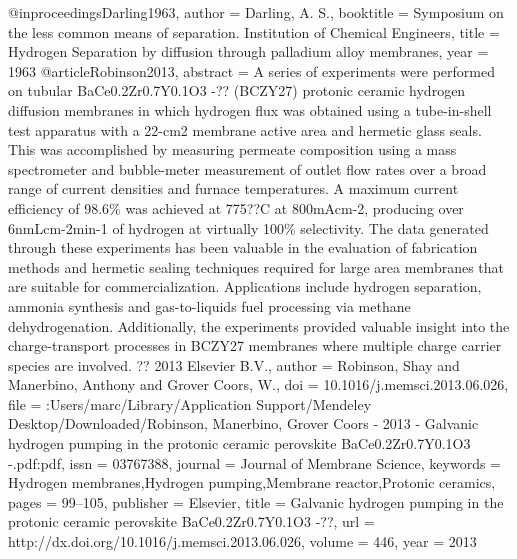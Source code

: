 @inproceedings{Darling1963,
author = {Darling, A. S.},
booktitle = {Symposium on the less common means of separation. Institution of Chemical Engineers},
title = {{Hydrogen Separation by diffusion through palladium alloy membranes}},
year = {1963}
}
@article{Robinson2013,
abstract = {A series of experiments were performed on tubular BaCe0.2Zr0.7Y0.1O3 -?? (BCZY27) protonic ceramic hydrogen diffusion membranes in which hydrogen flux was obtained using a tube-in-shell test apparatus with a 22-cm2 membrane active area and hermetic glass seals. This was accomplished by measuring permeate composition using a mass spectrometer and bubble-meter measurement of outlet flow rates over a broad range of current densities and furnace temperatures. A maximum current efficiency of 98.6{\%} was achieved at 775??C at 800mAcm-2, producing over 6nmLcm-2min-1 of hydrogen at virtually 100{\%} selectivity. The data generated through these experiments has been valuable in the evaluation of fabrication methods and hermetic sealing techniques required for large area membranes that are suitable for commercialization. Applications include hydrogen separation, ammonia synthesis and gas-to-liquids fuel processing via methane dehydrogenation. Additionally, the experiments provided valuable insight into the charge-transport processes in BCZY27 membranes where multiple charge carrier species are involved. ?? 2013 Elsevier B.V.},
author = {Robinson, Shay and Manerbino, Anthony and {Grover Coors}, W.},
doi = {10.1016/j.memsci.2013.06.026},
file = {:Users/marc/Library/Application Support/Mendeley Desktop/Downloaded/Robinson, Manerbino, Grover Coors - 2013 - Galvanic hydrogen pumping in the protonic ceramic perovskite BaCe0.2Zr0.7Y0.1O3 -.pdf:pdf},
issn = {03767388},
journal = {Journal of Membrane Science},
keywords = {Hydrogen membranes,Hydrogen pumping,Membrane reactor,Protonic ceramics},
pages = {99--105},
publisher = {Elsevier},
title = {{Galvanic hydrogen pumping in the protonic ceramic perovskite BaCe0.2Zr0.7Y0.1O3 -??}},
url = {http://dx.doi.org/10.1016/j.memsci.2013.06.026},
volume = {446},
year = {2013}
}
